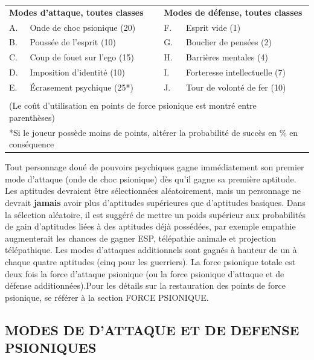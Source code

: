 \documentclass[11pt]{article}
\begin{document}
{{\parindent0.5cm
\begin{tabular}{llcll}
\multicolumn{2}{l}{\textbf{Modes d'attaque, toutes classes}} && \multicolumn{2}{l}{\textbf{Modes de défense, toutes classes}} \\
A. & Onde de choc psionique (20)  && F. & Esprit vide (1) \\
B. & Poussée de l'esprit (10) 	  && G. & Bouclier de pensées (2) \\
C. & Coup de fouet sur l'ego (15) && H. & Barrières mentales (4) \\
D. & Imposition d'identité (10)   && I. & Forteresse intellectuelle (7) \\
E. & Écrasement psychique (25*)   && J. & Tour de volonté de fer (10) \\
&&&& \\
\multicolumn{5}{p{15cm}}{(Le coût d'utilisation en points de force psionique est montré entre parenthèses)} \\
\multicolumn{5}{p{15cm}}{*Si le joueur possède moins de points, altérer la probabilité de succès en \% en conséquence} \\
\end{tabular}}

Tout personnage doué de pouvoirs psychiques gagne immédiatement son premier mode d'attaque (onde de choc psionique) dès qu'il gagne sa première aptitude. Les aptitudes devraient être sélectionnées aléatoirement, mais un personnage ne devrait \textbf{jamais} avoir plus d'aptitudes supérieures que d'aptitudes basiques. Dans la sélection aléatoire, il est suggéré de mettre un poids supérieur aux probabilités de gain d'aptitudes liées à des aptitudes déjà possédées, par exemple empathie augmenterait les chances de gagner ESP, télépathie animale et projection télépathique. Les modes d'attaques additionnels sont gagnés à hauteur de un à chaque quatre aptitudes (cinq pour les guerriers). La force psionique totale est deux fois la force d'attaque psionique (ou la force psionique d'attaque et de défense additionnées).Pour les détails sur la restauration des points de force psionique, se référer à la section FORCE PSIONIQUE. %

\subsection*{\normalsize MODES DE D'ATTAQUE ET DE DEFENSE PSIONIQUES}

}
\end{document}
